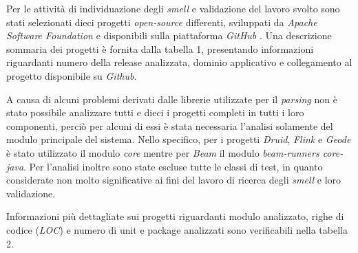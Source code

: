 Per le attività di individuazione degli \textit{smell} e validazione del lavoro svolto sono stati selezionati dieci progetti \textit{open-source} differenti, sviluppati da \textit{Apache Software Foundation} \cite{apache} e disponibili sulla piattaforma \textit{GitHub} \cite{github}. Una descrizione sommaria dei progetti è fornita dalla tabella 1, presentando informazioni riguardanti numero della release analizzata, dominio applicativo e collegamento al progetto disponibile su \textit{Github}.

A causa di alcuni problemi derivati dalle librerie utilizzate per il \textit{parsing} non è stato possibile analizzare tutti e dieci i progetti completi in tutti i loro componenti, perciò per alcuni di essi è stata necessaria l'analisi solamente del modulo principale del sistema. Nello specifico, per i progetti \textit{Druid}, \textit{Flink} e \textit{Geode} è stato utilizzato il modulo \textit{core} mentre per \textit{Beam} il modulo \textit{beam-runners core-java}.
Per l'analisi inoltre sono state escluse tutte le classi di test, in quanto considerate non molto significative ai fini del lavoro di ricerca degli \textit{smell} e loro validazione.

Informazioni più dettagliate sui progetti riguardanti modulo analizzato, righe di codice (\textit{LOC}) e numero di unit e package analizzati sono verificabili nella tabella 2. \\

